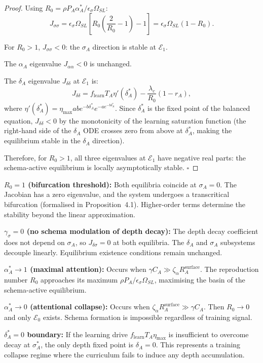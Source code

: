 \begin{proof}
Using $R_0 = \rho P_A \alpha_A^* / \epsilon_\sigma \Omega_{SL}$:
\[
J_{\sigma\sigma} = \epsilon_\sigma \Omega_{SL} \left[R_0\left(\frac{2}{R_0} - 1\right) - 1\right]
= \epsilon_\sigma \Omega_{SL} (1 - R_0).
\]

For $R_0 > 1$, $J_{\sigma\sigma} < 0$: the $\sigma_A$ direction is
stable at $\mathcal{E}_1$.

The $\alpha_A$ eigenvalue $J_{\alpha\alpha} < 0$ is unchanged.

The $\delta_A$ eigenvalue $J_{\delta\delta}$ at $\mathcal{E}_1$ is:
\[
J_{\delta\delta} = f_{\text{learn}} T_A \eta'(\delta_A^*) - \frac{\lambda_c}{R_0} (1 - r_A),
\]
where $\eta'(\delta_A^*) = \eta_{\max} a b e^{-b\delta_A^*} e^{-a e^{-b\delta_A^*}}$.
Since $\delta_A^*$ is the fixed point of the balanced equation,
$J_{\delta\delta} < 0$ by the monotonicity of the learning saturation
function (the right-hand side of the $\delta_A$ ODE crosses zero from
above at $\delta_A^*$, making the equilibrium stable in the $\delta_A$
direction).

Therefore, for $R_0 > 1$, all three eigenvalues at $\mathcal{E}_1$
have negative real parts: the schema-active equilibrium is locally
asymptotically stable.
$\square$
\end{proof}

\begin{boundary-case}
\textbf{$R_0 = 1$ (bifurcation threshold):}
Both equilibria coincide at $\sigma_A = 0$. The Jacobian has a zero
eigenvalue, and the system undergoes a transcritical bifurcation
(formalised in Proposition~4.1). Higher-order terms determine the
stability beyond the linear approximation.

\textbf{$\gamma_\sigma = 0$ (no schema modulation of depth decay):}
The depth decay coefficient does not depend on $\sigma_A$, so
$J_{\delta\sigma} = 0$ at both equilibria. The $\delta_A$ and
$\sigma_A$ subsystems decouple linearly. Equilibrium existence
conditions remain unchanged.

\textbf{$\alpha_A^* \to 1$ (maximal attention):}
Occurs when $\gamma C_A \gg \zeta_\alpha R_A^{\text{surface}}$.
The reproduction number $R_0$ approaches its maximum
$\rho P_A / \epsilon_\sigma \Omega_{SL}$, maximising the basin
of the schema-active equilibrium.

\textbf{$\alpha_A^* \to 0$ (attentional collapse):}
Occurs when $\zeta_\alpha R_A^{\text{surface}} \gg \gamma C_A$.
Then $R_0 \to 0$ and only $\mathcal{E}_0$ exists. Schema formation
is impossible regardless of training signal.

\textbf{$\delta_A^* = 0$ boundary:}
If the learning drive $f_{\text{learn}} T_A \eta_{\max}$ is
insufficient to overcome decay at $\sigma_A^*$, the only depth
fixed point is $\delta_A = 0$. This represents a training collapse
regime where the curriculum fails to induce any depth accumulation.
\end{boundary-case}

